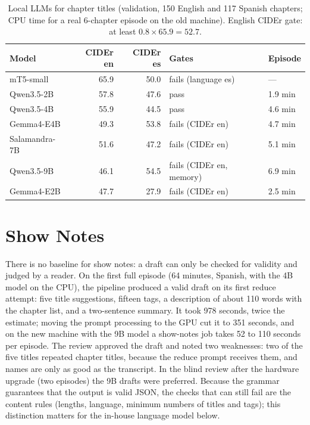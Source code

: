 \begin{table}[H]
\centering
\caption{Local LLMs for chapter titles (validation, 150 English and 117 Spanish chapters; CPU time for a real 6-chapter episode on the old machine). English CIDEr gate: at least $0.8 \times 65.9 = 52.7$.}
\label{tab:titles-llm}
\small
\begin{tabular}{@{}lrrll@{}}
\toprule
\textbf{Model} & \textbf{CIDEr en} & \textbf{CIDEr es} & \textbf{Gates} & \textbf{Episode} \\
\midrule
mT5-small & 65.9 & 50.0 & fails (language es) & --- \\
Qwen3.5-2B & 57.8 & 47.6 & pass & 1.9 min \\
Qwen3.5-4B & 55.9 & 44.5 & pass & 4.6 min \\
Gemma4-E4B \cite{gemma4_ref} & 49.3 & 53.8 & fails (CIDEr en) & 4.7 min \\
Salamandra-7B \cite{gonzalezagirre2025salamandra} & 51.6 & 47.2 & fails (CIDEr en) & 5.1 min \\
Qwen3.5-9B & 46.1 & 54.5 & fails (CIDEr en, memory) & 6.9 min \\
Gemma4-E2B \cite{gemma4_ref} & 47.7 & 27.9 & fails (CIDEr en) & 2.5 min \\
\bottomrule
\end{tabular}
\end{table}

\section{Show Notes}

There is no baseline for show notes: a draft can only be checked for validity and judged by a reader. On the first full episode (64 minutes, Spanish, with the 4B model on the CPU), the pipeline produced a valid draft on its first reduce attempt: five title suggestions, fifteen tags, a description of about 110 words with the chapter list, and a two-sentence summary. It took 978 seconds, twice the estimate; moving the prompt processing to the GPU cut it to 351 seconds, and on the new machine with the 9B model a show-notes job takes 52 to 110 seconds per episode. The review approved the draft and noted two weaknesses: two of the five titles repeated chapter titles, because the reduce prompt receives them, and names are only as good as the transcript. In the blind review after the hardware upgrade (two episodes) the 9B drafts were preferred. Because the grammar guarantees that the output is valid JSON, the checks that can still fail are the content rules (lengths, language, minimum numbers of titles and tags); this distinction matters for the in-house language model below.

